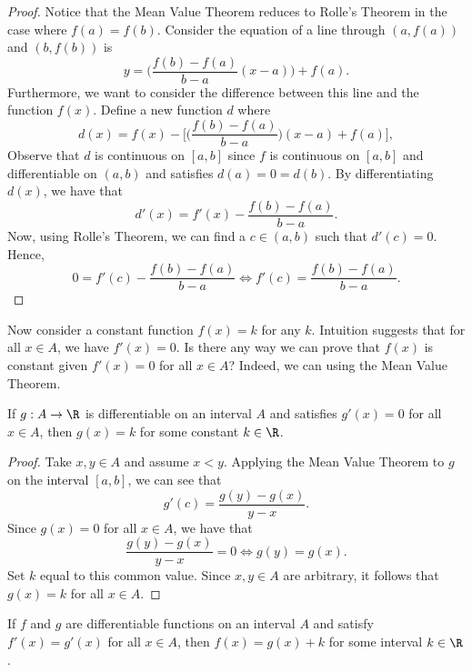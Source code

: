 \begin{proof}
    Notice that the Mean Value Theorem reduces to Rolle's Theorem in the case where \( f(a) = f(b)  \).
Consider the equation of a line through \( (a, f(a) ) \) and \( (b , f(b) ) \) is 
\[  y = \Big( \frac{ f(b) - f(a)  }{ b - a  } (x -a ) \Big) + f(a). \]
Furthermore, we want to consider the difference between this line and the function \( f(x)  \). Define a new function \( d   \) where 
\[  d(x) = f(x) - \Big[ \Big( \frac{ f(b) - f(a)  }{ b - a  }  \Big) (x - a ) + f(a)     \Big], \]
Observe that \( d  \) is continuous on \( [a,b]  \) since \( f  \) is continuous on \( [a,b]  \) and differentiable on \( (a,b)  \) and satisfies \( d(a) = 0 = d(b)  \). By differentiating \( d(x)  \), we have that 
\[  d'(x) = f'(x) - \frac{ f(b) - f(a)  }{ b - a  }. \]
Now, using Rolle's Theorem, we can find a \( c \in (a,b)  \) such that \( d'(c) = 0   \). Hence, 
\[  0 = f'(c) - \frac{ f(b) - f(a)  }{ b -a  } \iff f'(c) = \frac{ f(b) - f(a)  }{ b - a  }.  \] 

\end{proof}

Now consider a constant function \( f(x) = k  \) for any \( k  \). Intuition suggests that for all \( x \in A  \), we have \( f'(x) = 0  \). Is there any way we can prove that \( f(x)  \) is constant given \( f'(x) = 0  \) for all \( x \in A  \)? Indeed, we can using the Mean Value Theorem.

\begin{tcolorbox}
\begin{cor}
If \( g: A \to \R  \) is differentiable on an interval \( A  \) and satisfies \( g'(x) = 0  \) for all \( x \in A  \), then \( g(x) = k  \) for some constant \(  k \in \R  \).
\end{cor}
\end{tcolorbox}

\begin{proof}
    Take \( x, y \in A  \) and assume \( x < y  \). Applying the Mean Value Theorem to \( g  \) on the interval \( [a,b ] \), we can see that 
    \[  g'(c) = \frac{ g(y) - g(x)   }{ y- x  }.  \]
    Since \( g(x) = 0  \) for all \( x \in A  \), we have that 
    \[  \frac{ g(y) - g(x)  }{ y -x  } = 0  \iff g(y) = g(x). \]
    Set \(  k  \) equal to this common value. Since \( x,y \in A  \) are arbitrary, it follows that \( g(x) = k \) for all \( x \in A  \).
\end{proof}

\begin{tcolorbox}
\begin{cor}
If \( f  \) and \( g  \) are differentiable functions on an interval \( A  \) and satisfy \( f'(x) = g'(x)   \) for all \( x \in A  \), then \( f(x) = g(x) + k  \) for some interval \(  k \in \R  \).
\end{cor}
\end{tcolorbox}

